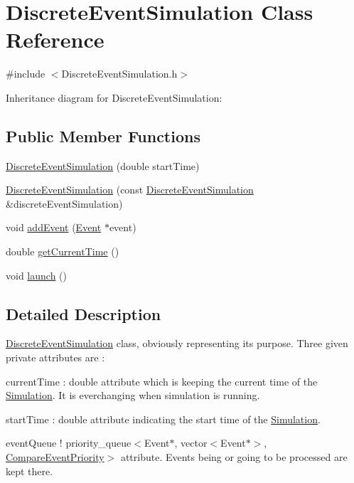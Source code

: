 \hypertarget{classDiscreteEventSimulation}{}\section{Discrete\+Event\+Simulation Class Reference}
\label{classDiscreteEventSimulation}


{\ttfamily \#include $<$Discrete\+Event\+Simulation.\+h$>$}



Inheritance diagram for Discrete\+Event\+Simulation\+:
\subsection*{Public Member Functions}
\begin{DoxyCompactItemize}
\item 
\hyperlink{classDiscreteEventSimulation_afef7ef964c3a7d151150120184c58d99}{Discrete\+Event\+Simulation} (double start\+Time)
\item 
\hyperlink{classDiscreteEventSimulation_aa92e10279fe95449f35139a4893192f5}{Discrete\+Event\+Simulation} (const \hyperlink{classDiscreteEventSimulation}{Discrete\+Event\+Simulation} \&discrete\+Event\+Simulation)
\item 
void \hyperlink{classDiscreteEventSimulation_a03770d2464931bc3555d4f34379aaa1e}{add\+Event} (\hyperlink{classEvent}{Event} $\ast$event)
\item 
double \hyperlink{classDiscreteEventSimulation_a41c5492fdf2d5ef2a9a27200871caabd}{get\+Current\+Time} ()
\item 
void \hyperlink{classDiscreteEventSimulation_aae616e227950798dc958171210975713}{launch} ()
\end{DoxyCompactItemize}


\subsection{Detailed Description}
\hyperlink{classDiscreteEventSimulation}{Discrete\+Event\+Simulation} class, obviously representing it\textquotesingle{}s purpose. Three given private attributes are \+:
\begin{DoxyItemize}
\item current\+Time \+: double attribute which is keeping the current time of the \hyperlink{classSimulation}{Simulation}. It is everchanging when simulation is running.
\item start\+Time \+: double attribute indicating the start time of the \hyperlink{classSimulation}{Simulation}.
\item event\+Queue ! priority\+\_\+queue$<$Event$\ast$, vector$<$\+Event$\ast$$>$, \hyperlink{classCompareEventPriority}{Compare\+Event\+Priority}$>$ attribute. Events being or going to be processed are kept there. 
\end{DoxyItemize}

